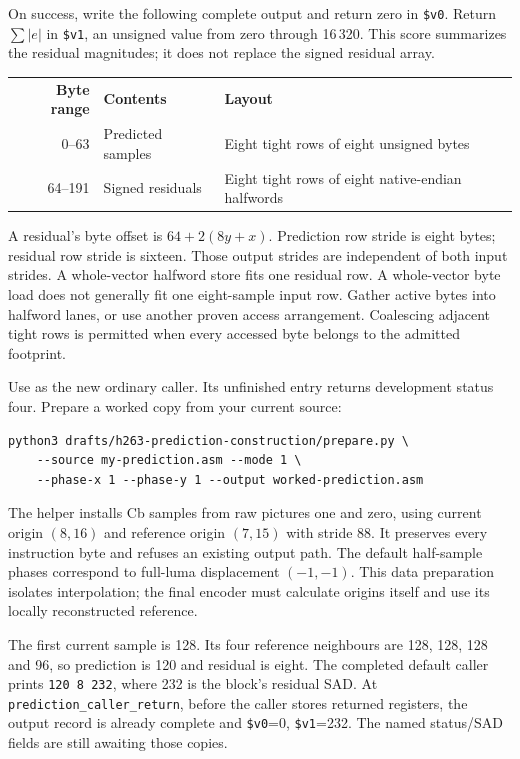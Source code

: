 On success, write the following complete output and return zero in
\texttt{\$v0}. Return $\sum |e|$ in \texttt{\$v1}, an unsigned value from zero
through 16\,320. This score summarizes the residual magnitudes; it does not
replace the signed residual array.
\begin{center}
  \begin{tabular}{rll}
    \textbf{Byte range} & \textbf{Contents} & \textbf{Layout}                                   \\
    0--63               & Predicted samples & Eight tight rows of eight unsigned bytes          \\
    64--191             & Signed residuals  & Eight tight rows of eight native-endian halfwords
  \end{tabular}
\end{center}
A residual's byte offset is $64+2(8y+x)$. Prediction row stride is eight bytes;
residual row stride is sixteen. Those output strides are independent of both
input strides. A whole-vector halfword store fits one residual row. A whole-vector
byte load does not generally fit one eight-sample input row. Gather active bytes
into halfword lanes, or use another proven access arrangement. Coalescing adjacent
tight rows is permitted when every accessed byte belongs to the admitted footprint.

Use  as the new ordinary caller.
Its unfinished entry returns development status four. Prepare a worked copy from
your current source:
\begin{verbatim}
python3 drafts/h263-prediction-construction/prepare.py \
    --source my-prediction.asm --mode 1 \
    --phase-x 1 --phase-y 1 --output worked-prediction.asm
\end{verbatim}
The helper installs Cb samples from raw pictures one and zero, using current
origin $(8,16)$ and reference origin $(7,15)$ with stride 88. It preserves every
instruction byte and refuses an existing output path. The default half-sample
phases correspond to full-luma displacement $(-1,-1)$. This data preparation
isolates interpolation; the final encoder must calculate origins itself and
use its locally reconstructed reference.

The first current sample is 128. Its four reference neighbours are 128, 128,
128 and 96, so prediction is 120 and residual is eight. The completed default
caller prints \texttt{120 8 232}, where 232 is the block's residual SAD.
At \texttt{prediction\_caller\_return}, before the caller stores returned
registers, the output record is already complete and \texttt{\$v0}=0,
\texttt{\$v1}=232. The named status/SAD fields are still awaiting those copies.
